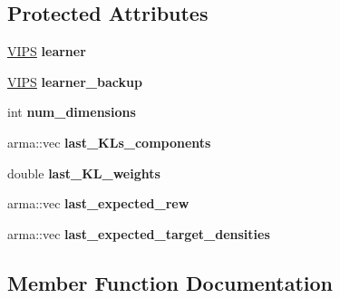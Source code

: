 \subsection*{Protected Attributes}
\begin{DoxyCompactItemize}
\item 
\hyperlink{classVIPS}{V\+I\+PS} {\bfseries learner}\hypertarget{classVIPS__PythonWrapper_a967a73404906831a828f926b4fc8c7b2}{}\label{classVIPS__PythonWrapper_a967a73404906831a828f926b4fc8c7b2}

\item 
\hyperlink{classVIPS}{V\+I\+PS} {\bfseries learner\+\_\+backup}\hypertarget{classVIPS__PythonWrapper_aaa74d7a0f9b7039f49cd7736f0fd463a}{}\label{classVIPS__PythonWrapper_aaa74d7a0f9b7039f49cd7736f0fd463a}

\item 
int {\bfseries num\+\_\+dimensions}\hypertarget{classVIPS__PythonWrapper_ae70db7c8f890fe7bba73c15de92e9d0b}{}\label{classVIPS__PythonWrapper_ae70db7c8f890fe7bba73c15de92e9d0b}

\item 
arma\+::vec {\bfseries last\+\_\+\+K\+Ls\+\_\+components}\hypertarget{classVIPS__PythonWrapper_a0d7e2c9449dc4411ba71d623c8a4d236}{}\label{classVIPS__PythonWrapper_a0d7e2c9449dc4411ba71d623c8a4d236}

\item 
double {\bfseries last\+\_\+\+K\+L\+\_\+weights}\hypertarget{classVIPS__PythonWrapper_aa37f34c104c8b41f3d8fd7a1023da696}{}\label{classVIPS__PythonWrapper_aa37f34c104c8b41f3d8fd7a1023da696}

\item 
arma\+::vec {\bfseries last\+\_\+expected\+\_\+rew}\hypertarget{classVIPS__PythonWrapper_ad33747fdb016a926ab1ea3524aa2b36b}{}\label{classVIPS__PythonWrapper_ad33747fdb016a926ab1ea3524aa2b36b}

\item 
arma\+::vec {\bfseries last\+\_\+expected\+\_\+target\+\_\+densities}\hypertarget{classVIPS__PythonWrapper_afd270b0737302fb8a3e755057f4363c2}{}\label{classVIPS__PythonWrapper_afd270b0737302fb8a3e755057f4363c2}

\end{DoxyCompactItemize}


\subsection{Member Function Documentation}
